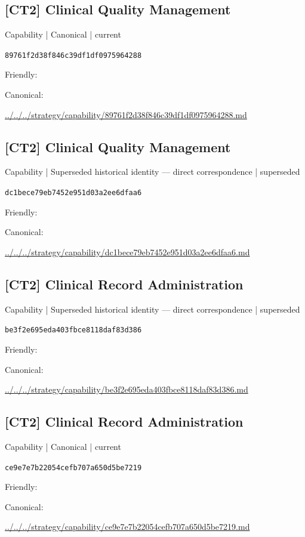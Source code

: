 \documentclass[10pt,a4paper]{article}
\begin{document}
\subsection*{[CT2] Clinical Quality Management}
{\small Capability | Canonical | current}\par
\texttt{89761f2d38f846c39df1df0975964288}\par
Friendly: \par
Canonical: \par
{\footnotesize\url{../../../strategy/capability/89761f2d38f846c39df1df0975964288.md}}\par
\subsection*{[CT2] Clinical Quality Management}
{\small Capability | Superseded historical identity — direct correspondence | superseded}\par
\texttt{dc1bece79eb7452e951d03a2ee6dfaa6}\par
Friendly: \par
Canonical: \par
{\footnotesize\url{../../../strategy/capability/dc1bece79eb7452e951d03a2ee6dfaa6.md}}\par
\subsection*{[CT2] Clinical Record Administration}
{\small Capability | Superseded historical identity — direct correspondence | superseded}\par
\texttt{be3f2e695eda403fbce8118daf83d386}\par
Friendly: \par
Canonical: \par
{\footnotesize\url{../../../strategy/capability/be3f2e695eda403fbce8118daf83d386.md}}\par
\subsection*{[CT2] Clinical Record Administration}
{\small Capability | Canonical | current}\par
\texttt{ce9e7e7b22054cefb707a650d5be7219}\par
Friendly: \par
Canonical: \par
{\footnotesize\url{../../../strategy/capability/ce9e7e7b22054cefb707a650d5be7219.md}}\par
\end{document}
